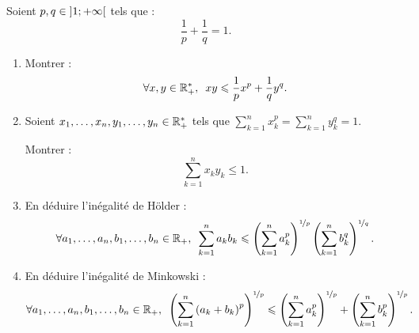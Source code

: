 \begin{corr}
\end{corr}

\begin{exo}
Soient \(p,q\in\left]1;+\infty\right[\) tels que : \[\dfrac{1}{p}+\dfrac{1}{q}=1.\]

\begin{enumerate}
\item Montrer : \[\quantifs{\forall x,y\in\Rps}xy\leq\dfrac{1}{p}x^p+\dfrac{1}{q}y^q.\]

\item Soient \(x_1,\dots,x_n,y_1,\dots,y_n\in\mathbb{R}_+^*\) tels que \(\sum_{k=1}^nx_k^p=\sum_{k=1}^ny_k^q=1\).

Montrer : \[\sum_{k=1}^nx_ky_k\leq1.\]

\item En déduire l'inégalité de Hölder : \[\quantifs{\forall a_1,\dots,a_n,b_1,\dots,b_n\in\Rp}\sum_{k=1}^na_kb_k\leq\paren{\sum_{k=1}^na_k^p}^{\nicefrac{1}{p}}\paren{\sum_{k=1}^nb_k^q}^{\nicefrac{1}{q}}.\]

\item En déduire l'inégalité de Minkowski : \[\quantifs{\forall a_1,\dots,a_n,b_1,\dots,b_n\in\Rp}\paren{\sum_{k=1}^n\paren{a_k+b_k}^p}^{\nicefrac{1}{p}}\leq\paren{\sum_{k=1}^na_k^p}^{\nicefrac{1}{p}}+\paren{\sum_{k=1}^nb_k^p}^{\nicefrac{1}{p}}.\]
\end{enumerate}
\end{exo}

\begin{corr}
\end{corr}